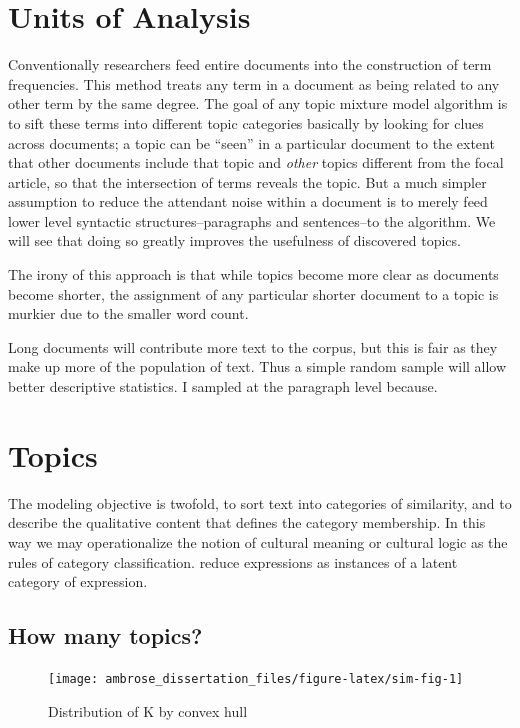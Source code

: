 \documentclass[]{book}
\theoremstyle{definition}
\theoremstyle{definition}
\theoremstyle{definition}
\theoremstyle{remark}
\begin{document}
\hypertarget{units-of-analysis}{%
\section{Units of Analysis}\label{units-of-analysis}}

Conventionally researchers feed entire documents into the construction
of term frequencies. This method treats any term in a document as being
related to any other term by the same degree. The goal of any topic
mixture model algorithm is to sift these terms into different topic
categories basically by looking for clues across documents; a topic can
be ``seen'' in a particular document to the extent that other documents
include that topic and \emph{other} topics different from the focal
article, so that the intersection of terms reveals the topic. But a much
simpler assumption to reduce the attendant noise within a document is to
merely feed lower level syntactic structures--paragraphs and
sentences--to the algorithm. We will see that doing so greatly improves
the usefulness of discovered topics.

The irony of this approach is that while topics become more clear as
documents become shorter, the assignment of any particular shorter
document to a topic is murkier due to the smaller word count.

Long documents will contribute more text to the corpus, but this is fair
as they make up more of the population of text. Thus a simple random
sample will allow better descriptive statistics. I sampled at the
paragraph level because.

\hypertarget{kd-dp2}{%
\section{Topics}\label{kd-dp2}}

The modeling objective is twofold, to sort text into categories of
similarity, and to describe the qualitative content that defines the
category membership. In this way we may operationalize the notion of
cultural meaning or cultural logic as the rules of category
classification. reduce expressions as instances of a latent category of
expression.

\hypertarget{how-many-topics}{%
\subsection{How many topics?}\label{how-many-topics}}

\begin{figure}

{\centering \texttt{[image: ambrose\_dissertation\_files/figure-latex/sim-fig-1]} 

}

\caption{Distribution of K by convex hull}\label{fig:sim-fig}
\end{figure}
\end{document}

